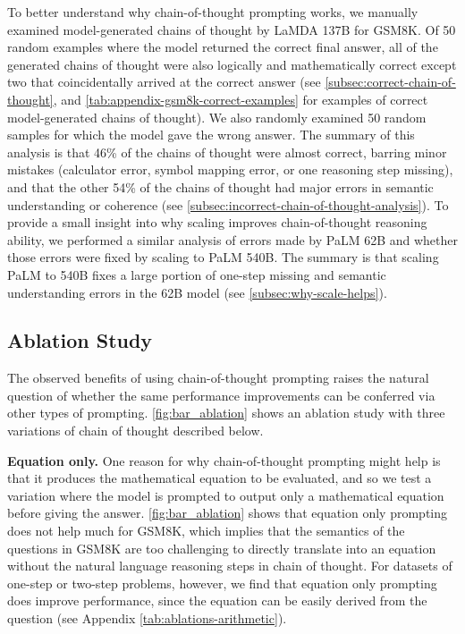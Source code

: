 \documentclass[]{article}
\theoremstyle{plain}
\theoremstyle{definition}
\theoremstyle{remark}
\newcommand{\lamda}[0]{LaMDA}
\newcommand{\palm}[0]{PaLM}
\begin{document}
To better understand why chain-of-thought prompting works,
we manually examined model-generated chains of thought by \lamda{} 137B for GSM8K.
Of 50 random examples where the model returned the correct final answer, all of the generated chains of thought were also logically and mathematically correct except two that coincidentally arrived at the correct answer (see \cref{subsec:correct-chain-of-thought}, and \cref{tab:appendix-gsm8k-correct-examples} for examples of correct model-generated chains of thought).
We also randomly examined 50 random samples for which the model gave the wrong answer.
The summary of this analysis is that 46\% of the chains of thought were almost correct, barring minor mistakes (calculator error, symbol mapping error, or one reasoning step missing), and that the other 54\% of the chains of thought had major errors in semantic understanding or coherence (see \cref{subsec:incorrect-chain-of-thought-analysis}). 
To provide a small insight into why scaling improves chain-of-thought reasoning ability, we performed a similar analysis of errors made by \palm{} 62B and whether those errors were fixed by scaling to \palm{} 540B.
The summary is that scaling \palm{} to 540B fixes a large portion of one-step missing and semantic understanding errors in the 62B model (see \cref{subsec:why-scale-helps}).


\subsection{Ablation Study}\label{subsec:math-ablation}

The observed benefits of using chain-of-thought prompting raises the natural question of whether the same performance improvements can be conferred via other types of prompting.
\cref{fig:bar_ablation} shows an ablation study with three variations of chain of thought described below.

\textbf{Equation only.} One reason for why chain-of-thought prompting might help is that it produces the mathematical equation to be evaluated, and so we test a variation where the model is prompted to output only a mathematical equation before giving the answer. 
\cref{fig:bar_ablation} shows that equation only prompting does not help much for GSM8K, which implies that the semantics of the questions in GSM8K are too challenging to directly translate into an equation without the natural language reasoning steps in chain of thought.
For datasets of one-step or two-step problems, however, we find that equation only prompting does improve performance, since the equation can be easily derived from the question (see Appendix \cref{tab:ablations-arithmetic}). 
\end{document}

